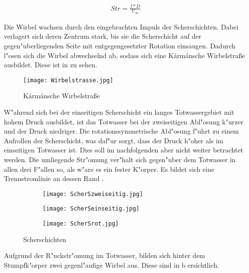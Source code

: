 \begin{align}
	{Str}=\frac{f*D}{U_{\infty}}	
	\label{eq:Str}
\end{align}

Die Wirbel wachsen durch den eingebrachten Impuls der Scherschichten. Dabei verlagert sich deren Zentrum stark, bis sie die Scherschicht auf der gegen"uberliegenden Seite mit entgegengesetzter Rotation einsaugen. Dadurch l"osen sich die Wirbel abwechselnd ab, sodass sich eine K\'arm\'ansche Wirbelstra\ss{}e ausbildet. Diese ist in  zu sehen. 

\begin{figure}[h]
	\centering
	\texttt{[image: Wirbelstrasse.jpg]}
	\caption{K\'arm\'ansche Wirbelstra\ss{}e \cite{Hucho.2011}}
	\label{fig:Wirbelstrasse}
\end{figure}


W"ahrend sich bei der einseitigen Scherschicht ein langes Totwassergebiet mit hohem Druck ausbildet, ist das Totwasser bei der zweiseitigen Abl"osung k"urzer und der Druck niedriger. Die rotationssymmetrische Abl"osung f"uhrt zu einem Aufrollen der Scherschicht, was daf"ur sorgt, dass der Druck h"oher als im einseitigen Totwasser ist. Dies soll im nachfolgenden aber nicht weiter betrachtet werden. Die umliegende Str"omung ver"halt sich gegen"uber dem Totwasser in allen drei F"allen so, als w"are es  ein fester K"orper. Es bildet sich eine Trennstromlinie an dessen Rand \cite{Hucho.2011}. 

\begin{figure}[h]
	\centering
	\begin{subfigure}[c]{0.35\textwidth}
		\texttt{[image: ScherSzweiseitig.jpg]}
		\label{fig:Scherungzweiseitig}
	\end{subfigure}
	\begin{subfigure}[c]{0.35\textwidth}		
		\texttt{[image: ScherSeinseitig.jpg]}
		\label{fig:Scherungeinseitig}
	\end{subfigure}
	\begin{subfigure}[c]{0.35\textwidth}
		\texttt{[image: ScherSrot.jpg]}
		\label{fig:Scherungrotatorisch}
	\end{subfigure}
	\caption{ Scherschichten \cite{Hucho.2011}}
	\label{fig:Scherschichten}
\end{figure}


Aufgrund der R"uckstr"omung im Totwasser, bilden sich hinter dem Stumpfk"orper zwei gegenl"aufige Wirbel aus. Diese sind in b ersichtlich. 

